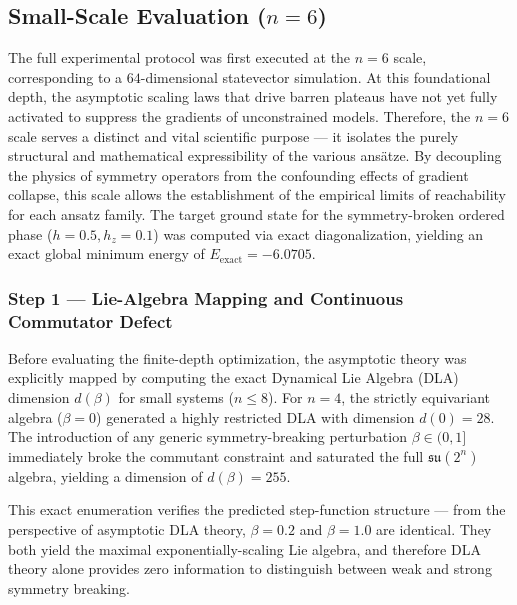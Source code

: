 \documentclass[10pt,twocolumn]{article}
\theoremstyle{remark}
\begin{document}
\vspace{1em}

\subsection{Small-Scale Evaluation ($n=6$)}

The full experimental protocol was first executed at the $n=6$ scale, corresponding to a $64$-dimensional statevector simulation. At this foundational depth, the asymptotic scaling laws that drive barren plateaus have not yet fully activated to suppress the gradients of unconstrained models. Therefore, the $n=6$ scale serves a distinct and vital scientific purpose --- it isolates the purely structural and mathematical expressibility of the various ans\"atze. By decoupling the physics of symmetry operators from the confounding effects of gradient collapse, this scale allows the establishment of the empirical limits of reachability for each ansatz family. The target ground state for the symmetry-broken ordered phase ($h=0.5, h_z=0.1$) was computed via exact diagonalization, yielding an exact global minimum energy of $E_{\text{exact}} = -6.0705$.

\subsubsection{Step 1 --- Lie-Algebra Mapping and Continuous Commutator Defect}

Before evaluating the finite-depth optimization, the asymptotic theory was explicitly mapped by computing the exact Dynamical Lie Algebra (DLA) dimension $d(\beta)$ for small systems ($n \le 8$). 
For $n=4$, the strictly equivariant algebra ($\beta=0$) generated a highly restricted DLA with dimension $d(0) = 28$. The introduction of any generic symmetry-breaking perturbation $\beta \in (0, 1]$ immediately broke the commutant constraint and saturated the full $\mathfrak{su}(2^n)$ algebra, yielding a dimension of $d(\beta) = 255$.

This exact enumeration verifies the predicted step-function structure --- from the perspective of asymptotic DLA theory, $\beta=0.2$ and $\beta=1.0$ are identical. They both yield the maximal exponentially-scaling Lie algebra, and therefore DLA theory alone provides zero information to distinguish between weak and strong symmetry breaking.
\end{document}
